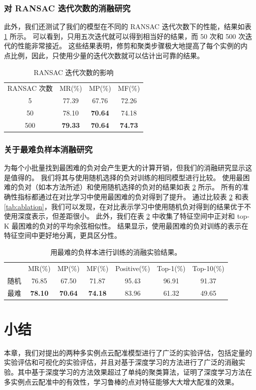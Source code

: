 \subsubsection{对 RANSAC 迭代次数的消融研究}此外，我们还测试了我们的模型在不同的 RANSAC 迭代次数下的性能，结果如表 \ref{tab:ransac} 所示。
可以看到，只用五次迭代就可以得到相当好的结果，而 50 次和 500 次迭代的性能非常接近。
这些结果表明，修剪和聚类步骤极大地提高了每个实例的内点比例，因此，只使用少量的迭代次数就可以估计出可靠的结果。


\begin{table}
  \caption{
        RANSAC 迭代次数的影响
  }
  \centering
  \begin{tabular}{cccc}
    \hline\noalign{\smallskip}
    RANSAC 次数 & MR(\%)         & MP(\%)         & MF(\%)          \\
  \noalign{\smallskip}
  \hline
  \noalign{\smallskip}
  5   & 77.39          & 67.76          & 72.26              \\
  50  & 78.10          & \textbf{70.64} & 74.18                \\
  500 & \textbf{79.33} & \textbf{70.64} & \textbf{74.73}  \\  
  \hline
  \end{tabular}
  \label{tab:ransac}
\end{table}

\subsubsection{关于最难负样本消融研究}
为每个小批量找到最困难的负对会产生更大的计算开销，但我们的消融研究显示这是值得的。
我们将其与使用随机选择的负对训练的相同模型进行比较。
使用最困难的负对（如本方法所述）和使用随机选择的负对的结果如表 \ref{tab:hardest} 所示。
所有的准确性指标都通过在对比学习中使用最困难的负对得到了提升。
通过比较表 \ref{tab:hardest} 和表 \ref{tab:ablation}，我们可以发现，在对比表示学习中使用随机负对得到的结果优于不使用深度表示，但差距很小。
此外，我们在表 \ref{tab:hardest} 中收集了特征空间中正对和 top-K 最困难的负对的平均余弦相似性。
结果显示，使用最困难的负对训练的表示在特征空间中更好地分离，更具区分性。

\begin{table}
  \caption{
        用最难的负样本进行训练的消融实验结果。
  }
  \centering
  \begin{tabular}{ccccccc}
    \hline\noalign{\smallskip}
    & MR(\%) & MP(\%) & MF(\%) & Positive(\%) & Top-1(\%) & Top-10(\%) \\
    \noalign{\smallskip}
    \hline
    \noalign{\smallskip}
    随机  & 76.85  & 67.50  & 71.87  & 95.43 & 96.91 & 91.37  \\
    最难 & \textbf{78.10} & \textbf{70.64} & \textbf{74.18} & 83.96 & 61.32 & 49.65 \\  
    \hline
  \end{tabular}
  \label{tab:hardest}
\end{table}


\section{小结}
本章，我们对提出的两种多实例点云配准模型进行了广泛的实验评估，包括定量的实验评估和可视化的实验评估，并且对基于深度学习的方法进行了广泛的消融实验。其中基于深度学习的方法效果超过了单纯的聚类算法，证明了深度学习方法在多实例点云配准中的有效性，学习鲁棒的点对特征能够大大增大配准的效果。